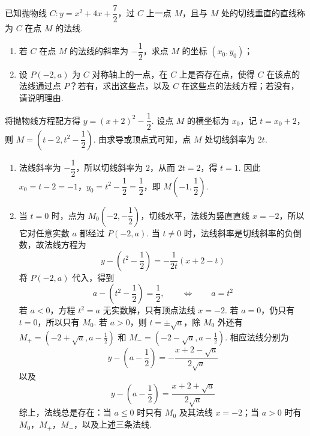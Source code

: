 \begin{problem}
已知抛物线 \(C:y=x^{2}+4x+\dfrac{7}{2}\)，过 \(C\) 上一点 \(M\)，且与 \(M\) 处的切线垂直的直线称为 \(C\) 在点 \(M\) 的法线.

\begin{enumerate}
\item 若 \(C\) 在点 \(M\) 的法线的斜率为 \(-\dfrac{1}{2}\)，求点 \(M\) 的坐标 \((x_{0},y_{0})\)；
\item 设 \(P(-2,a)\) 为 \(C\) 对称轴上的一点，在 \(C\) 上是否存在点，使得 \(C\) 在该点的法线通过点 \(P\)？若有，求出这些点，以及 \(C\) 在这些点的法线方程；若没有，请说明理由.
\end{enumerate}
\end{problem}

\begin{solution}
将抛物线方程配方得 \(y=(x+2)^{2}-\dfrac{1}{2}\). 设点 \(M\) 的横坐标为 \(x_{0}\)，记 \(t=x_{0}+2\)，则 \(M=(t-2,t^{2}-\dfrac{1}{2})\). 由求导或顶点式可知，点 \(M\) 处切线斜率为 \(2t\).

\begin{enumerate}
\item 法线斜率为 \(-\dfrac{1}{2}\)，所以切线斜率为 \(2\)，从而 \(2t=2\)，得 \(t=1\). 因此 \(x_{0}=t-2=-1\)，\(y_{0}=t^2-\dfrac12=\dfrac12\)，即 \(M\left(-1,\dfrac12\right)\).
\item 当 \(t=0\) 时，点为 \(M_{0}\left(-2,-\dfrac12\right)\)，切线水平，法线为竖直直线 \(x=-2\)，所以它对任意实数 \(a\) 都经过 \(P(-2,a)\). 当 \(t\neq0\) 时，法线斜率是切线斜率的负倒数，故法线方程为
\[
y-\left(t^{2}-\frac{1}{2}\right)=-\frac{1}{2t}(x+2-t)
\]
将 \(P(-2,a)\) 代入，得到
\[
a-\left(t^{2}-\frac12\right)=\frac12,
\qquad\Longleftrightarrow\qquad a=t^2
\]
若 \(a<0\)，方程 \(t^2=a\) 无实数解，只有顶点法线 \(x=-2\). 若 \(a=0\)，仍只有 \(t=0\)，所以只有 \(M_0\). 若 \(a>0\)，则 \(t=\pm\sqrt a\)，除 \(M_0\) 外还有
\(M_{+}=\left(-2+\sqrt a,a-\frac12\right)\) 和 \(M_{-}=\left(-2-\sqrt a,a-\frac12\right)\).
相应法线分别为
\[
y-\left(a-\frac12\right)=-\frac{x+2-\sqrt a}{2\sqrt a}
\]
以及
\[
y-\left(a-\frac12\right)=\frac{x+2+\sqrt a}{2\sqrt a}
\]
综上，法线总是存在：当 \(a\leqslant0\) 时只有 \(M_0\) 及其法线 \(x=-2\)；当 \(a>0\) 时有 \(M_0\)，\(M_+\)，\(M_-\)，以及上述三条法线.
\end{enumerate}
\end{solution}
